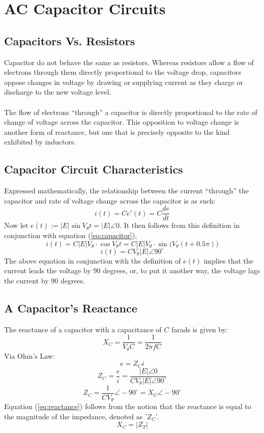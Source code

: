 \documentclass{article}
\begin{document}
	\section[Capacitor]{AC Capacitor Circuits}
	\subsection[CapvRes]{Capacitors Vs. Resistors}
	
	Capacitor do not behave the same as resistors. Whereas resistors allow 
		a 
	flow of electrons through them directly proportional to the voltage drop, 
	capacitors oppose changes in voltage by drawing or supplying current as 
	they charge or discharge to the new voltage level. \\ \\
	The flow of electrons “through” a capacitor is directly proportional to the 
	rate of change of voltage across the capacitor. This opposition to voltage 
	change is another form of reactance, but one that is precisely opposite to 
	the kind exhibited by inductors.
	\subsection[Equation]{Capacitor Circuit Characteristics}
	Expressed mathematically, the relationship between the current “through” 
	the capacitor and rate of voltage change across the capacitor is as such:
	\begin{equation}\label{eq:capacitor}
		i(t) = C e'(t) = C\frac{de}{dt}
	\end{equation}
	Now let $e(t):=|E|\sin V_\theta t = |E|\angle0$.  It then follows from this 
	definition in conjunction with equation (\ref{eq:capacitor}),
	$$ i(t) = C|E|V_\theta \cdot \cos V_\theta t = C|E|V_\theta \cdot \sin 
	\big(V_\theta(t + 0.5\pi)\big)$$
	$$ i(t) = CV_\theta|E|\angle90^{\circ}$$
	The above equation in conjunction with the definition of $e(t)$ implies 
	that the current leads the voltage by $90$ degrees, or, to put it another 
	way, the voltage lags the current by $90$ degrees.
	\subsection[Reactance]{A Capacitor's Reactance}
	The reactance of a capacitor with a capacitance of $C$ farads is given by:
	\begin{equation}\label{eq:reactance}
		X_C=\frac{1}{V_\theta C} = \frac{1}{2\pi f C}
	\end{equation}
	Via Ohm's Law:
	$$ e = Z_C i$$
	$$ Z_C = \frac{e}{i} = \frac{|E|\angle0}{CV_\theta|E|\angle90^{\circ}}$$
	$$ Z_C = \frac{1}{CV_\theta} \angle-90^{\circ} = X_C\angle-90^{\circ}$$
	Equation (\ref{eq:reactance}) follows from the notion that the reactance is 
	equal to the magnitude of the impedance, denoted as '$Z_C$'.
	$$ X_C = |Z_T|$$
\end{document}
